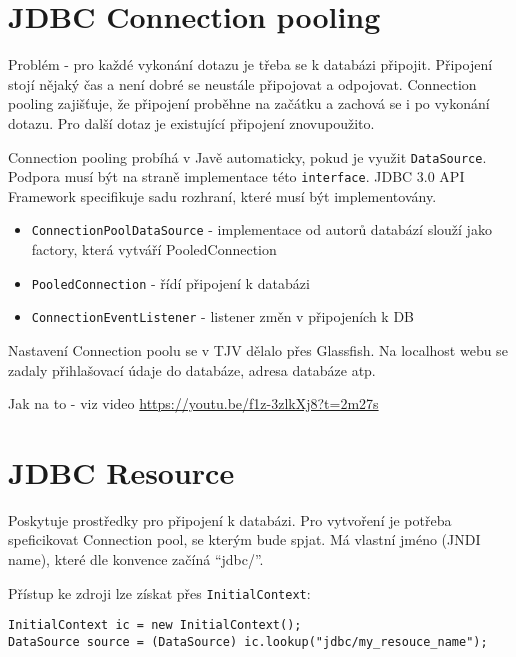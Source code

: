 \documentclass{szzclass}
\begin{document}
\section{JDBC Connection pooling}
Problém - pro každé vykonání dotazu je třeba se k databázi připojit. Připojení stojí nějaký čas a není dobré se neustále připojovat a odpojovat. Connection pooling zajišťuje, že připojení proběhne na začátku a zachová se i po vykonání dotazu. Pro další dotaz je existující připojení znovupoužito.

Connection pooling probíhá v Javě automaticky, pokud je využit \texttt{DataSource}. Podpora musí být na straně implementace této \texttt{interface}. JDBC 3.0 API Framework specifikuje sadu rozhraní, které musí být implementovány.
\begin{itemize}
\item \texttt{ConnectionPoolDataSource} - implementace od autorů databází slouží jako factory, která vytváří PooledConnection
\item \texttt{PooledConnection} - řídí připojení k databázi
\item \texttt{ConnectionEventListener} - listener změn v připojeních k DB
\end{itemize}

Nastavení Connection poolu se v TJV dělalo přes Glassfish. Na localhost webu se zadaly přihlašovací údaje do databáze, adresa databáze atp.

Jak na to - viz video \url{https://youtu.be/f1z-3zlkXj8?t=2m27s }

\section{JDBC Resource}
Poskytuje prostředky pro připojení k databázi. Pro vytvoření je potřeba speficikovat Connection pool, se kterým bude spjat. Má vlastní jméno (JNDI name), které dle konvence začíná “jdbc/”.

Přístup ke zdroji lze získat přes \texttt{InitialContext}:

\begin{verbatim}
InitialContext ic = new InitialContext();
DataSource source = (DataSource) ic.lookup("jdbc/my_resouce_name");
\end{verbatim}
\end{document}

